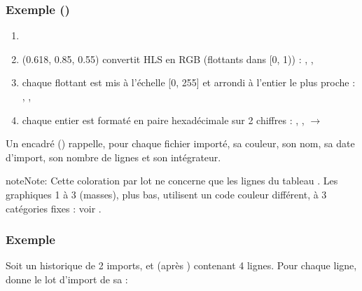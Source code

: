 \documentclass[letterpaper,10pt,english]{sphinxmanual}
\begin{document}
\subsubsection{Exemple ()}
\label{\detokenize{2_BacLipidDB:exemple-color-1}}\begin{enumerate}
%
\item {} 
\sphinxAtStartPar
{}

\item {} 
\sphinxAtStartPar
{} (0.618, 0.85, 0.55) convertit HLS en RGB (flottants dans {[}0, 1)) :
, , 

\item {} 
\sphinxAtStartPar
chaque flottant est mis à l’échelle {[}0, 255{]} et arrondi à l’entier le plus proche :
, , 

\item {} 
\sphinxAtStartPar
chaque entier est formaté en paire hexadécimale sur 2 chiffres : ,
,  \(\rightarrow\) 

\end{enumerate}

\sphinxAtStartPar
Un encadré  () rappelle, pour chaque fichier importé, sa
couleur, son nom, sa date d’import, son nombre de lignes et son intégrateur.

\begin{sphinxadmonition}{note}{Note:}
\sphinxAtStartPar
Cette coloration par lot ne concerne que les lignes du tableau . Les graphiques 1 à 3 (masses),
plus bas, utilisent un code couleur différent, à 3 catégories fixes : voir {\hyperref[\detokenize{2_BacLipidDB:groupe-d-import}]{}}.
\end{sphinxadmonition}


\subsubsection{Exemple}
\label{\detokenize{2_BacLipidDB:exemple}}
\sphinxAtStartPar
Soit un historique de 2 imports, et  (après ) contenant 4 lignes. Pour
chaque ligne,  donne le lot d’import de sa  :
\end{document}
